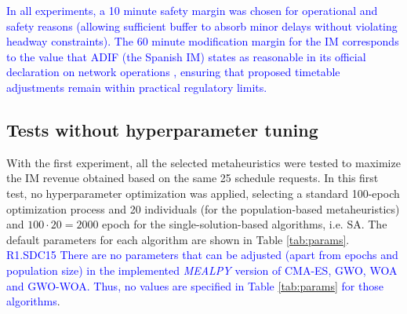 \documentclass[Afour,sagev,times]{sagej}
\newcommand{\primero}[1]{\textcolor{blue}{#1}}
\begin{document}
\primero{
In all experiments, a 10 minute safety margin was chosen for operational and safety reasons (allowing sufficient buffer to absorb minor delays without violating headway constraints). The 60 minute modification margin for the \gls{IM} corresponds to the value that ADIF (the Spanish \gls{IM}) states as reasonable in its official declaration on network operations \cite{Adif24}, ensuring that proposed timetable adjustments remain within practical regulatory limits.
}

\subsection{Tests without hyperparameter tuning}
\label{sec:tests_without_hiperparameter_tunning}

With the first experiment, all the selected metaheuristics were tested to maximize the \gls{IM} revenue obtained based on the same 25 schedule requests. In this first test, no hyperparameter optimization was applied, selecting a standard 100-epoch optimization process and 20 individuals (for the population-based metaheuristics) and $ 100 \cdot 20 = 2000 $ epoch for the single-solution-based algorithms, i.e. \gls{SA}. The default parameters for each algorithm are shown in Table \ref{tab:params}. \primero{R1.SDC15 There are no parameters that can be adjusted (apart from epochs and population size) in the implemented \textit{MEALPY} version of \gls{CMA-ES}, \gls{GWO}, \gls{WOA} and \gls{GWO-WOA}. Thus, no values are specified in Table \ref{tab:params} for those algorithms}.
\end{document}
